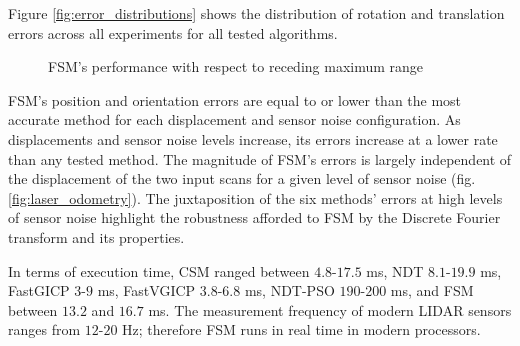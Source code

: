 Figure \ref{fig:error_distributions} shows the distribution of rotation and
translation errors across all experiments for all tested algorithms.

\begin{figure*}
\begin{framed}
  \vspace{-0.75cm}\hspace{-0.75cm}
    \subfloat{}
    \qquad \hspace{-1.25cm}
    \subfloat{}
    \vspace{-2.5cm}
    \caption{\small Distribution of orientation and position errors across a
             range of maximal positional and orientational displacements, for
             progressively larger sensor measurement noise levels. Each boxplot
             represents $10$ iterations over $\approx 45$$\cdot$$10^3$ random
             scan pairs for each configuration. FSM's errors are largely
             independent of the initial displacement of scans for a given level
             of sensor noise}%
    \label{fig:error_distributions}%
\end{framed}
\end{figure*}

\begin{figure}
\vspace{-0.75cm}\hspace{0.1cm}
    
    \vspace{-2.5cm}
    \caption{FSM's performance with respect to receding maximum range}%
    \label{}%
\end{figure}

FSM's position and orientation errors are equal to or lower than the most
accurate method for each displacement and sensor noise configuration. As
displacements and sensor noise levels increase, its errors increase at a lower
rate than any tested method. The magnitude of FSM's errors is largely
independent of the displacement of the two input scans for a given level of
sensor noise (fig.  \ref{fig:laser_odometry}). The juxtaposition of the six
methods' errors at high levels of sensor noise highlight the robustness
afforded to FSM by the Discrete Fourier transform and its properties.

In terms of execution time, CSM ranged between $4.8$-$17.5$ ms, NDT
$8.1$-$19.9$ ms, FastGICP $3$-$9$ ms, FastVGICP $3.8$-$6.8$ ms,
NDT-PSO $190$-$200$ ms, and FSM between $13.2$ and $16.7$ ms.  The
measurement frequency of modern LIDAR sensors ranges from $12$-$20$ Hz;
therefore FSM runs in real time in modern processors.
